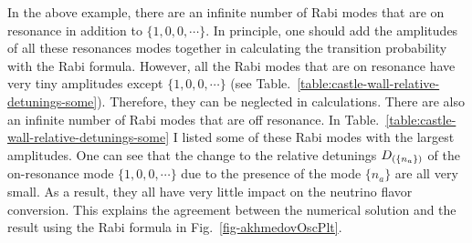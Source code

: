 In the above example, there are an infinite number of Rabi modes that are on resonance in addition to $\{1,0,0, \cdots\}$. In principle, one should add the amplitudes of all these resonances modes together in calculating the transition probability with the Rabi formula. However, all the Rabi modes that are on resonance have very tiny amplitudes except $\{1,0,0,\cdots\}$ (see Table.~\ref{table:castle-wall-relative-detunings-some}). Therefore, they can be neglected in calculations. There are also an infinite number of Rabi modes that are off resonance. In Table.~\ref{table:castle-wall-relative-detunings-some} I listed some of these Rabi modes with the largest amplitudes. One can see that the change to the relative detunings $D_{(\{n_a\})}$ of the on-resonance mode $\{1,0,0,\cdots\}$ due to the presence of the mode $\{n_a\}$ are all very small. As a result, they all have very little impact on the neutrino flavor conversion. This explains the agreement between the numerical solution and the result using the Rabi formula in Fig.~\ref{fig-akhmedovOscPlt}.


